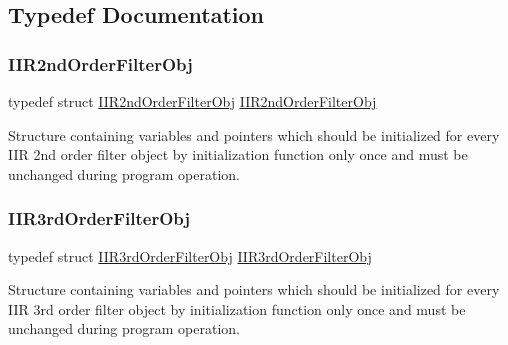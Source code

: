 \subsection{Typedef Documentation}
\mbox{\label{group___i_i_rfilter_pt_by_pt_ga8546a467eb7a73cec439600d41273514_ga8546a467eb7a73cec439600d41273514}} 
\subsubsection{\texorpdfstring{IIR2ndOrderFilterObj}{IIR2ndOrderFilterObj}}
{\footnotesize\ttfamily typedef struct \mbox{\hyperlink{struct_i_i_r2nd_order_filter_obj}{I\+I\+R2nd\+Order\+Filter\+Obj}}  \mbox{\hyperlink{struct_i_i_r2nd_order_filter_obj}{I\+I\+R2nd\+Order\+Filter\+Obj}}}



Structure containing variables and pointers which should be initialized for every I\+IR 2nd order filter object by initialization function only once and must be unchanged during program operation. 

\mbox{\label{group___i_i_rfilter_pt_by_pt_ga28932217270b94db6230648e203eb4ea_ga28932217270b94db6230648e203eb4ea}} 
\subsubsection{\texorpdfstring{IIR3rdOrderFilterObj}{IIR3rdOrderFilterObj}}
{\footnotesize\ttfamily typedef struct \mbox{\hyperlink{struct_i_i_r3rd_order_filter_obj}{I\+I\+R3rd\+Order\+Filter\+Obj}}  \mbox{\hyperlink{struct_i_i_r3rd_order_filter_obj}{I\+I\+R3rd\+Order\+Filter\+Obj}}}



Structure containing variables and pointers which should be initialized for every I\+IR 3rd order filter object by initialization function only once and must be unchanged during program operation. 

